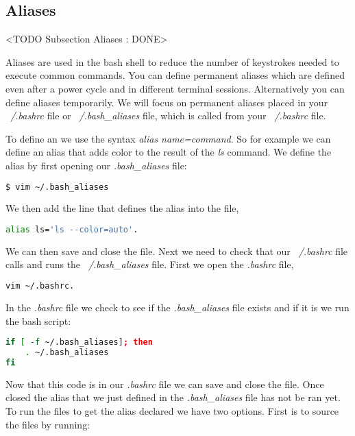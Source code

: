 \subsection{Aliases}
	<TODO Subsection Aliases : DONE>
	
Aliases are used in the bash shell to reduce the number of keystrokes needed to execute common commands. You can define permanent aliases which are defined even after a power cycle and in different terminal sessions. Alternatively you can define aliases temporarily. We will focus on permanent aliases placed in your \emph{~/.bashrc} file or \emph{~/.bash\_aliases} file, which is called from your \emph{~/.bashrc} file. 

To define an  we use the syntax \emph{alias name=command}. So for example we can define an alias that adds color to the result of the \emph{ls} command. We define the alias by first opening our \emph{.bash\_aliases} file:

\begin{lstlisting}[language=bash]
	$ vim ~/.bash_aliases
\end{lstlisting}

We then add the line that defines the alias into the file,

\begin{lstlisting}[language=bash]
alias ls='ls --color=auto'.
\end{lstlisting}

We can then save and close the file. Next we need to check that our \emph{~/.bashrc} file calls and runs the \emph{~/.bash\_aliases} file. First we open the \emph{.bashrc} file,

\begin{lstlisting}[language=bash]
vim ~/.bashrc.
\end{lstlisting}

In the \emph{.bashrc} file we check to see if the \emph{.bash\_aliases} file exists and if it is we run the bash script:

\begin{lstlisting}[language=bash]
if [ -f ~/.bash_aliases]; then
	. ~/.bash_aliases
fi
\end{lstlisting}

Now that this code is in our \emph{.bashrc} file we can save and close the file. Once closed the alias that we just defined in the \emph{.bash\_aliases} file has not be ran yet. To run the files to get the alias declared we have two options. First is to source the files by running:

